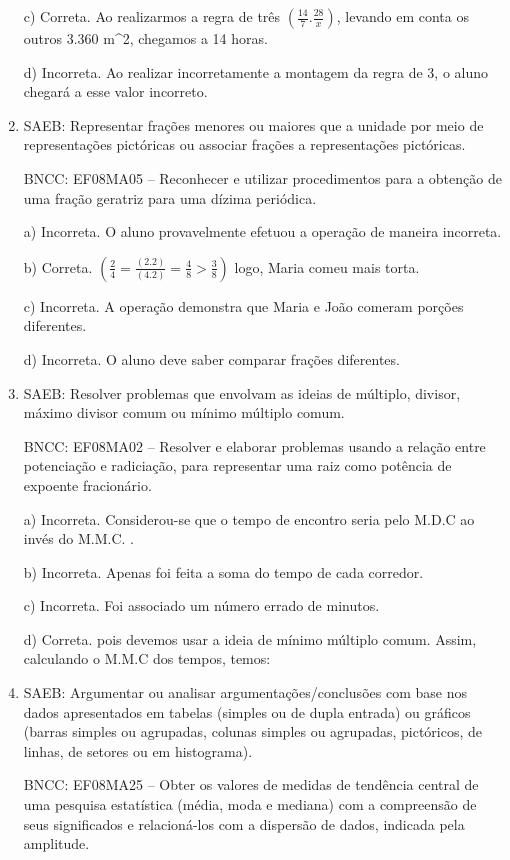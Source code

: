 \begin{enumerate}
c) Correta. Ao realizarmos a regra de três
$(\frac{14}{7} . \frac{28}{x})$, levando em conta os outros 3.360 m^2,
chegamos a 14 horas.

d) Incorreta. Ao realizar incorretamente a montagem da
regra de 3, o aluno chegará a esse valor incorreto.

\item SAEB: Representar frações menores ou maiores que a unidade por meio de
representações pictóricas ou associar frações a representações
pictóricas.

BNCC: EF08MA05 -- Reconhecer e utilizar procedimentos para a obtenção de
uma fração geratriz para uma dízima periódica.

a) Incorreta. O aluno provavelmente efetuou a operação de maneira
incorreta.

b) Correta. 
$(\frac{2}{4} = \frac{(2 . 2)} {(4 . 2)} = \frac{4}{8} > \frac{3}{8})$
logo, Maria comeu mais torta.

c) Incorreta. A operação demonstra que Maria e João comeram porções
diferentes.

d) Incorreta. O aluno deve saber comparar frações diferentes.

\item SAEB: Resolver problemas que envolvam as ideias de múltiplo, divisor,
máximo divisor comum ou mínimo múltiplo comum.

BNCC: EF08MA02 -- Resolver e elaborar problemas usando a relação entre
potenciação e radiciação, para representar uma raiz como potência de
expoente fracionário.

a) Incorreta. Considerou-se que o tempo de encontro seria pelo M.D.C
ao invés do M.M.C. .

b) Incorreta. Apenas foi feita a soma do tempo de cada corredor.

c) Incorreta. Foi associado um número errado de minutos.

d) Correta. pois devemos usar a ideia de mínimo múltiplo comum. Assim,
calculando o M.M.C dos tempos, temos:

\item SAEB: Argumentar ou analisar argumentações/conclusões com base nos dados
apresentados em tabelas (simples ou de dupla entrada) ou gráficos
(barras simples ou agrupadas, colunas simples ou agrupadas, pictóricos,
de linhas, de setores ou em histograma).

BNCC: EF08MA25 -- Obter os valores de medidas de tendência central de
uma pesquisa estatística (média, moda e mediana) com a compreensão de
seus significados e relacioná-los com a dispersão de dados, indicada
pela amplitude.


\end{enumerate}
